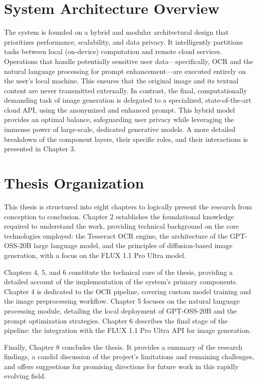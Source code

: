 \section{System Architecture Overview}
The system is founded on a hybrid and modular architectural design that prioritizes performance, scalability, and data privacy. It intelligently partitions tasks between local (on-device) computation and remote cloud services. Operations that handle potentially sensitive user data—specifically, OCR and the natural language processing for prompt enhancement—are executed entirely on the user's local machine. This ensures that the original image and its textual content are never transmitted externally. In contrast, the final, computationally demanding task of image generation is delegated to a specialized, state-of-the-art cloud API, using the anonymized and enhanced prompt. This hybrid model provides an optimal balance, safeguarding user privacy while leveraging the immense power of large-scale, dedicated generative models. A more detailed breakdown of the component layers, their specific roles, and their interactions is presented in Chapter 3.

\section{Thesis Organization}
This thesis is structured into eight chapters to logically present the research from conception to conclusion. Chapter 2 establishes the foundational knowledge required to understand the work, providing technical background on the core technologies employed: the Tesseract OCR engine, the architecture of the GPT-OSS-20B large language model, and the principles of diffusion-based image generation, with a focus on the FLUX 1.1 Pro Ultra model.

Chapters 4, 5, and 6 constitute the technical core of the thesis, providing a detailed account of the implementation of the system's primary components. Chapter 4 is dedicated to the OCR pipeline, covering custom model training and the image preprocessing workflow. Chapter 5 focuses on the natural language processing module, detailing the local deployment of GPT-OSS-20B and the prompt optimization strategies. Chapter 6 describes the final stage of the pipeline: the integration with the FLUX 1.1 Pro Ultra API for image generation.

Finally, Chapter 8 concludes the thesis. It provides a summary of the research findings, a candid discussion of the project's limitations and remaining challenges, and offers suggestions for promising directions for future work in this rapidly evolving field.
